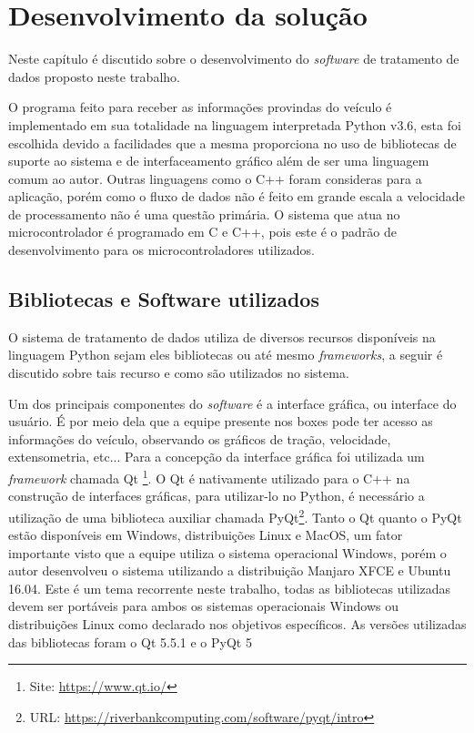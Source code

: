 \chapter{Desenvolvimento da solução}
	\label{ch:desenvolvimento}
Neste capítulo é discutido sobre o desenvolvimento do \textit{software} de tratamento de dados proposto neste trabalho. 

O programa feito para receber as informações provindas do veículo é implementado em sua totalidade na linguagem interpretada Python v3.6, esta foi escolhida devido a facilidades que a mesma proporciona no uso de bibliotecas de suporte ao sistema e de interfaceamento gráfico além de ser uma linguagem comum ao autor. Outras linguagens como o C++ foram consideras para a aplicação, porém como o fluxo de dados não é feito em grande escala a velocidade de processamento não é uma questão primária. O sistema que atua no microcontrolador é programado em C e C++, pois este é o padrão de desenvolvimento para os microcontroladores utilizados. 

\section{Bibliotecas e Software utilizados}
O sistema de tratamento de dados utiliza de diversos recursos disponíveis na linguagem Python sejam eles bibliotecas ou até mesmo \textit{frameworks}, a seguir é discutido sobre tais recurso e como são utilizados no sistema. 

Um dos principais componentes do \textit{software} é a interface gráfica, ou interface do usuário. É por meio dela que a equipe presente nos boxes pode ter acesso as informações do veículo, observando os gráficos de tração, velocidade, extensometria, etc... Para a concepção da interface gráfica foi utilizada um \textit{framework} chamada Qt \footnote[1]{Site: \url{https://www.qt.io/}}. O Qt é nativamente utilizado para o C++ na construção de interfaces gráficas, para utilizar-lo no Python, é necessário a utilização de uma biblioteca auxiliar chamada PyQt\footnote[2]{URL: \url{https://riverbankcomputing.com/software/pyqt/intro}}. Tanto o Qt quanto o PyQt estão disponíveis em Windows, distribuições Linux e MacOS, um fator importante visto que a equipe utiliza o sistema operacional Windows, porém o autor desenvolveu o sistema utilizando a distribuição Manjaro XFCE e Ubuntu 16.04. Este é um tema recorrente neste trabalho, todas as bibliotecas utilizadas devem ser portáveis para ambos os sistemas operacionais Windows ou distribuições Linux como declarado nos objetivos específicos. As versões utilizadas das bibliotecas foram o Qt 5.5.1 e o PyQt 5

